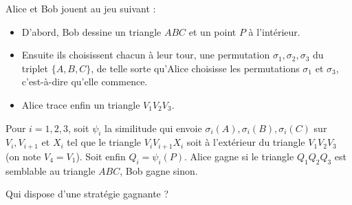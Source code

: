 Alice et Bob jouent au jeu suivant :
\begin{itemize}
\item D'abord, Bob dessine un triangle $ABC$ et un point $P$ à l'intérieur.
\item Ensuite ils choisissent chacun à leur tour, une permutation $\sigma_1, \sigma_2, \sigma_3$ du triplet $\{A, B, C\}$, de telle sorte qu'Alice choisisse les permutations $\sigma_1$ et $\sigma_3$, c'est-à-dire qu'elle commence.
\item Alice trace enfin un triangle $V_1V_2V_3$.
\end{itemize}
Pour $i=1, 2, 3$, soit $\psi_i$ la similitude qui envoie $\sigma_i(A), \sigma_i(B), \sigma_i(C)$ sur $V_i, V_{i + 1}$ et $X_i$ tel que le triangle $V_iV_{i+1}X_i$ soit à l'extérieur du triangle $V_1V_2V_3$ (on note $V_4=V_1$). Soit enfin $Q_i=\psi_i(P)$. Alice gagne si le triangle $Q_1Q_2Q_3$ est semblable au triangle $ABC$, Bob gagne sinon.

Qui dispose d'une stratégie gagnante ?